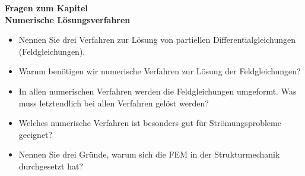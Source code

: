 \begin{framed}
\textbf{Fragen zum Kapitel}\\
\textbf{Numerische Lösungsverfahren}

\begin{itemize}
\item Nennen Sie drei Verfahren zur Lösung von partiellen Differentialgleichungen (Feldgleichungen).
\item Warum benötigen wir numerische Verfahren zur Lösung der Feldgleichungen?
\item In allen numerischen Verfahren werden die Feldgleichungen umgeformt. Was muss letztendlich bei allen Verfahren gelöst werden?
\item Welches numerische Verfahren ist besonders gut für Strömungsprobleme geeignet?
\item Nennen Sie drei Gründe, warum sich die FEM in der Strukturmechanik durchgesetzt hat?
\end{itemize}
\end{framed}